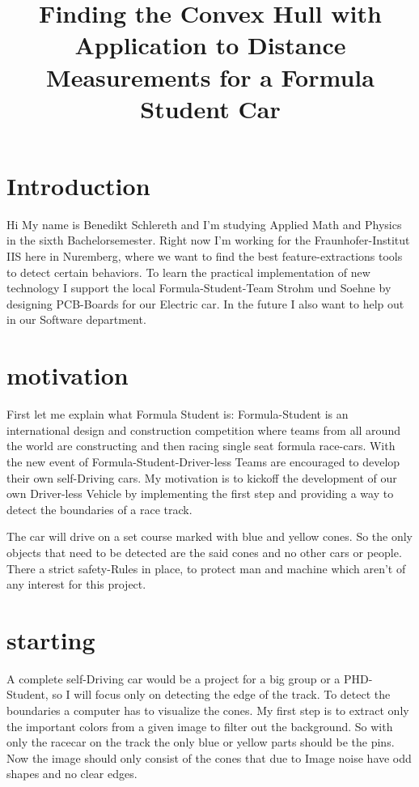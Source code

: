 \documentclass[10pt,a4paper]{article}
\title{Finding the Convex Hull with Application to Distance Measurements for a Formula Student Car}
\begin{document}
	\maketitle
	
	\section{Introduction}
	Hi
	My name is Benedikt Schlereth and I'm studying Applied Math and Physics in the sixth Bachelorsemester. 
	Right now I'm working for the Fraunhofer-Institut IIS here in Nuremberg, where we want to find the best feature-extractions tools to detect certain behaviors.
	To learn the practical implementation of new technology I support the local Formula-Student-Team Strohm und Soehne by designing PCB-Boards for our Electric car.
	In the future I also want to help out in our Software department.
	
	
	\section{motivation}
	First let me explain what Formula Student is:
	Formula-Student is an international design and construction competition where teams from all around the world are constructing and then racing single seat formula race-cars.
	With the new event of Formula-Student-Driver-less Teams are encouraged to develop their own self-Driving cars.
	My motivation is to kickoff the development of our own Driver-less Vehicle by implementing the first step and providing a way to detect the boundaries of a race track. 
	
	The car will drive on a set course marked with blue and yellow cones. So the only objects that need to be detected are the said cones and no other cars or people. There a strict safety-Rules in place, to protect man and machine which aren't of any interest for this project. 
	
	\section{starting}
	A complete self-Driving car would be a project for a big group or a PHD-Student, so I will focus only on detecting the edge of the track. 
	To detect the boundaries a computer has to visualize the cones.
	My first step is to extract only the important colors from a given image to filter out the background.
	So with only the racecar on the track the only blue or yellow parts should be the pins.
	Now the image should only consist of the cones that due to Image noise have odd shapes and no clear edges. 
	
\end{document}
